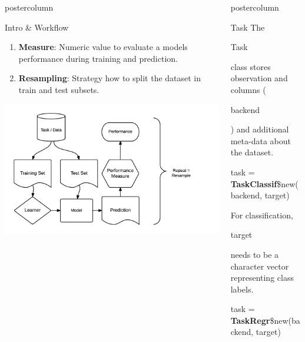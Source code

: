 \documentclass{beamer}
\newlength{\columnheight} %
\newcommand{\codeinline}[1]{\begin{codeboxinline}#1\end{codeboxinline}}
\begin{document}
\begin{frame}[fragile]{}
\begin{columns}
\begin{column}{.245\textwidth}
\begin{beamercolorbox}[center]{postercolumn}
\begin{minipage}{.98\textwidth}
{\begin{myblock}{Intro \& Workflow}
\begin{enumerate}
								\item \textbf{Measure}: Numeric value to evaluate a models performance during training and prediction.
								\item \textbf{Resampling}: Strategy how to split the dataset in train and test subsets.
							\end{enumerate}
							\vspace{1.5em}
							\includegraphics[width=1.13\textwidth]{img/ml_abstraction.png}
						\end{myblock}
					}
				\end{minipage}
			\end{beamercolorbox}
		\end{column}
		\begin{column}{.245\textwidth}
			\begin{beamercolorbox}[center]{postercolumn}
				\begin{minipage}{.98\textwidth}
					\parbox[t][\columnheight]{\textwidth}{
						\begin{myblock}{Task}
							The \codeinline{Task} class stores observation and columns (\codeinline{backend}) and additional
							meta-data about the dataset.
							\vspace{1em}
							\\
							\begin{codebox}
								task = \textbf{TaskClassif}\$new(backend, target)
							\end{codebox}
							For classification, \codeinline{target} needs to be a character vector representing class labels.
							\\
							\begin{codebox}
								task = \textbf{TaskRegr}\$new(backend, target)
							\end{codebox}

\end{myblock}}
\end{minipage}
\end{beamercolorbox}
\end{column}
\end{columns}
\end{frame}
\end{document}
